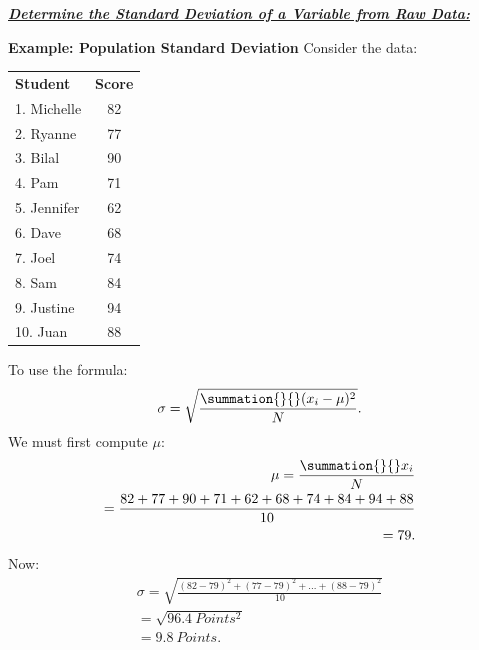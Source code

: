 \documentclass{report}
\begin{document}
        \bigbreak \noindent \bigbreak \noindent
        \textbf{\textit{\underline{Determine the Standard Deviation of a Variable from Raw Data:}}}
        \bigbreak \noindent 
        \begin{mdframed}
          \textbf{Example: Population Standard Deviation}
          \bigbreak \noindent 
          Consider the data:
          \bigbreak \noindent 
          \begin{center}
          \begin{tabular}{|l|c|}
              \hline
            \textbf{Student} & \textbf{Score} \\
            1. Michelle & 82 \\
            \hline
            2. Ryanne & 77 \\
            \hline
            3. Bilal & 90 \\
            \hline
            4. Pam & 71 \\
            \hline
            5. Jennifer & 62 \\
            \hline
            6. Dave & 68 \\
            \hline
            7. Joel & 74 \\
            \hline
            8. Sam & 84 \\
            \hline
            9. Justine & 94 \\
            \hline
            10. Juan & 88 \\
            \hline
          \end{tabular}
        \end{center}
        \bigbreak \noindent 
        To use the formula:
        \begin{align*}
            \sigma = \sqrt{\frac{\summation{}{}(x_{i} - \mu)^{2}}{N}}
        .\end{align*}
        \bigbreak \noindent 
        We must first compute $\mu$:
        \begin{align*}
            \mu = \frac{\summation{}{}x_{i}}{N} \\
            = \frac{82 + 77 + 90 + 71 + 62 + 68 + 74 + 84 + 94 + 88}{10} \\
            = 79
        .\end{align*}
        \bigbreak \noindent 
        Now:
        \begin{align*}
            \sigma = \sqrt{\frac{(82-79)^{2}+(77-79)^{2}+...+(88-79)^{2}}{10}} \\
            = \sqrt{96.4\ Points^{2}} \\
            =9.8\ Points
        .\end{align*}
        \end{mdframed}
\end{document}
